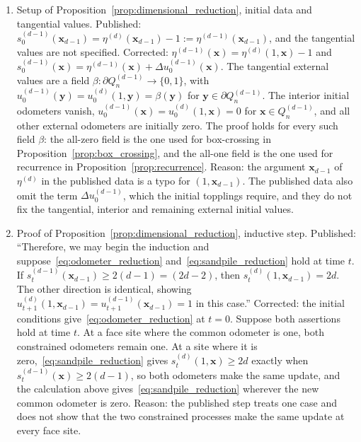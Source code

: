 \documentclass[12pt]{amsart}
\begin{document}
\begin{enumerate}
\item[C20.] Setup of Proposition~\ref{prop:dimensional_reduction}, initial data and tangential values. Published: $s_0^{(d-1)}(\mathbf x_{d-1})=\eta^{(d)}(\mathbf x_{d-1})-1:=\eta^{(d-1)}(\mathbf x_{d-1})$, and the tangential values are not specified. Corrected: $\eta^{(d-1)}(\mathbf x)=\eta^{(d)}(1,\mathbf x)-1$ and $s_0^{(d-1)}(\mathbf x)=\eta^{(d-1)}(\mathbf x)+\Delta u_0^{(d-1)}(\mathbf x)$. The tangential external values are a field $\beta:\partial Q_n^{(d-1)}\to\{0,1\}$, with $u_0^{(d-1)}(\mathbf y)=u_0^{(d)}(1,\mathbf y)=\beta(\mathbf y)$ for $\mathbf y\in\partial Q_n^{(d-1)}$. The interior initial odometers vanish, $u_0^{(d-1)}(\mathbf x)=u_0^{(d)}(1,\mathbf x)=0$ for $\mathbf x\in Q_n^{(d-1)}$, and all other external odometers are initially zero. The proof holds for every such field $\beta$: the all-zero field is the one used for box-crossing in Proposition~\ref{prop:box_crossing}, and the all-one field is the one used for recurrence in Proposition~\ref{prop:recurrence}. Reason: the argument $\mathbf x_{d-1}$ of $\eta^{(d)}$ in the published data is a typo for $(1,\mathbf x_{d-1})$. The published data also omit the term $\Delta u_0^{(d-1)}$, which the initial topplings require, and they do not fix the tangential, interior and remaining external initial values.
\item[C21.] Proof of Proposition~\ref{prop:dimensional_reduction}, inductive step. Published: ``Therefore, we may begin the induction and suppose~\eqref{eq:odometer_reduction} and~\eqref{eq:sandpile_reduction} hold at time $t$. If $s_t^{(d-1)}(\mathbf x_{d-1})\geq2(d-1)=(2d-2)$, then $s_t^{(d)}(1,\mathbf x_{d-1})=2d$. The other direction is identical, showing $u_{t+1}^{(d)}(1,\mathbf x_{d-1})=u_{t+1}^{(d-1)}(\mathbf x_{d-1})=1$ in this case.'' Corrected: the initial conditions give~\eqref{eq:odometer_reduction} at $t=0$. Suppose both assertions hold at time $t$. At a face site where the common odometer is one, both constrained odometers remain one. At a site where it is zero,~\eqref{eq:sandpile_reduction} gives $s_t^{(d)}(1,\mathbf x)\geq2d$ exactly when $s_t^{(d-1)}(\mathbf x)\geq2(d-1)$, so both odometers make the same update, and the calculation above gives~\eqref{eq:sandpile_reduction} wherever the new common odometer is zero. Reason: the published step treats one case and does not show that the two constrained processes make the same update at every face site.

\end{enumerate}
\end{document}
